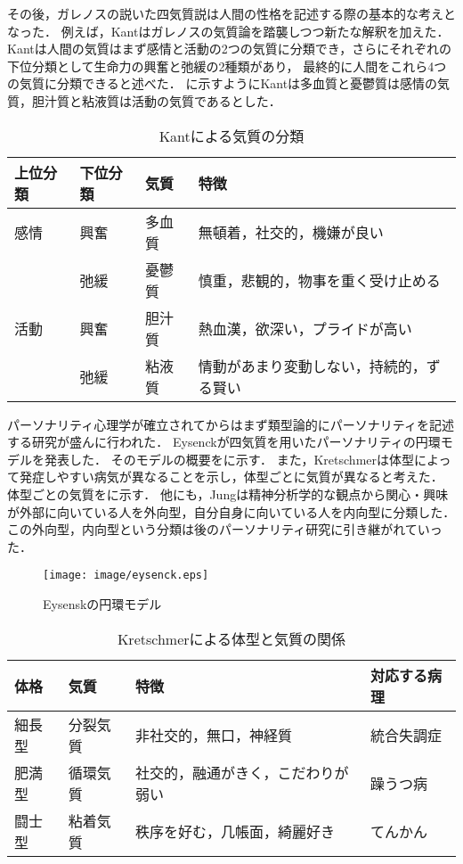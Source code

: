 その後，ガレノスの説いた四気質説は人間の性格を記述する際の基本的な考えとなった．
例えば，Kantはガレノスの気質論を踏襲しつつ新たな解釈を加えた\cite{kant}．
Kantは人間の気質はまず感情と活動の2つの気質に分類でき，さらにそれぞれの下位分類として生命力の興奮と弛緩の2種類があり，
最終的に人間をこれら4つの気質に分類できると述べた．
に示すようにKantは多血質と憂鬱質は感情の気質，胆汁質と粘液質は活動の気質であるとした．

\begin{table}[htb]
    \centering
    \caption{Kantによる気質の分類}
    \begin{tabular}{llll} \toprule
        上位分類 & 下位分類 & 気質 & 特徴 \\ \midrule
        感情 & 興奮 & 多血質 & 無頓着，社交的，機嫌が良い \\
        & 弛緩 & 憂鬱質 & 慎重，悲観的，物事を重く受け止める \\ \midrule
        活動 & 興奮 & 胆汁質 & 熱血漢，欲深い，プライドが高い \\ 
        & 弛緩 & 粘液質 & 情動があまり変動しない，持続的，ずる賢い \\ \bottomrule
    \end{tabular}
    \label{tab:kant}
\end{table}

パーソナリティ心理学が確立されてからはまず類型論的にパーソナリティを記述する研究が盛んに行われた．
Eysenck\cite{eysenck-1963}が四気質を用いたパーソナリティの円環モデルを発表した．
そのモデルの概要をに示す．
また，Kretschmer\cite{kretschmer}は体型によって発症しやすい病気が異なることを示し，体型ごとに気質が異なると考えた．
体型ごとの気質をに示す．
他にも，Jung\cite{jung}は精神分析学的な観点から関心・興味が外部に向いている人を外向型，自分自身に向いている人を内向型に分類した．
この外向型，内向型という分類は後のパーソナリティ研究に引き継がれていった．

\begin{figure}[htb]
    \centering
    \texttt{[image: image/eysenck.eps]}
    \caption{Eysenskの円環モデル \protect \footnotemark}
    \label{fig:eysenck}
\end{figure}

\begin{table}[htb]
    \centering
    \caption{Kretschmerによる体型と気質の関係 \protect \footnotemark}
    \begin{tabular}{llll} \toprule
        体格 & 気質 & 特徴 & 対応する病理 \\ \midrule
        細長型 & 分裂気質 & 非社交的，無口，神経質 & 統合失調症 \\
        肥満型 & 循環気質 & 社交的，融通がきく，こだわりが弱い & 躁うつ病 \\
        闘士型 & 粘着気質 & 秩序を好む，几帳面，綺麗好き & てんかん \\ \bottomrule
    \end{tabular}
    \label{tab:kretschmer}
\end{table}

